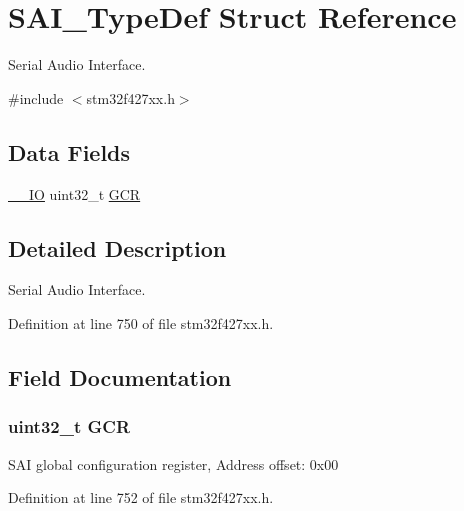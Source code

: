 \hypertarget{struct_s_a_i___type_def}{}\section{S\+A\+I\+\_\+\+Type\+Def Struct Reference}
\label{struct_s_a_i___type_def}


Serial Audio Interface.  




{\ttfamily \#include $<$stm32f427xx.\+h$>$}

\subsection*{Data Fields}
\begin{DoxyCompactItemize}
\item 
\hyperlink{core__sc300_8h_aec43007d9998a0a0e01faede4133d6be}{\+\_\+\+\_\+\+IO} uint32\+\_\+t \hyperlink{struct_s_a_i___type_def_aae092d9d07574afe1fbc79c8bf7f7c19}{G\+CR}
\end{DoxyCompactItemize}


\subsection{Detailed Description}
Serial Audio Interface. 

Definition at line 750 of file stm32f427xx.\+h.



\subsection{Field Documentation}
\subsubsection[{\texorpdfstring{G\+CR}{GCR}}]{ uint32\+\_\+t G\+CR}\hypertarget{struct_s_a_i___type_def_aae092d9d07574afe1fbc79c8bf7f7c19}{}\label{struct_s_a_i___type_def_aae092d9d07574afe1fbc79c8bf7f7c19}
S\+AI global configuration register, Address offset\+: 0x00 

Definition at line 752 of file stm32f427xx.\+h.



